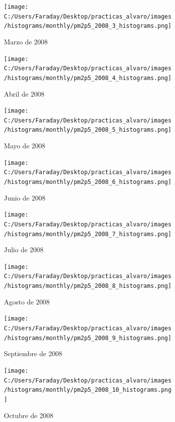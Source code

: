 \documentclass[12pt]{article}
\begin{document}
\begin{figure}[H]
\centering
\begin{subfigure}[h]{0.45\textwidth}
\texttt{[image: C:/Users/Faraday/Desktop/practicas\_alvaro/images/histograms/monthly/pm2p5\_2008\_3\_histograms.png]}
\caption{Marzo de 2008}
\label{fig:hist-mon-4-3-2008}
\end{subfigure}
%
\begin{subfigure}[H]{0.45\textwidth}
\texttt{[image: C:/Users/Faraday/Desktop/practicas\_alvaro/images/histograms/monthly/pm2p5\_2008\_4\_histograms.png]}
\caption{Abril de 2008}
\label{fig:hist-mon-4-4-2008}
\end{subfigure}
\caption{}
\end{figure}

\begin{figure}[H]
\centering
\begin{subfigure}[h]{0.45\textwidth}
\texttt{[image: C:/Users/Faraday/Desktop/practicas\_alvaro/images/histograms/monthly/pm2p5\_2008\_5\_histograms.png]}
\caption{Mayo de 2008}
\label{fig:hist-mon-4-5-2008}
\end{subfigure}
%
\begin{subfigure}[H]{0.45\textwidth}
\texttt{[image: C:/Users/Faraday/Desktop/practicas\_alvaro/images/histograms/monthly/pm2p5\_2008\_6\_histograms.png]}
\caption{Junio de 2008}
\label{fig:hist-mon-4-6-2008}
\end{subfigure}
\caption{}
\end{figure}

\newpage

\begin{figure}[H]
\centering
\begin{subfigure}[h]{0.45\textwidth}
\texttt{[image: C:/Users/Faraday/Desktop/practicas\_alvaro/images/histograms/monthly/pm2p5\_2008\_7\_histograms.png]}
\caption{Julio de 2008}
\label{fig:hist-mon-4-7-2008}
\end{subfigure}
%
\begin{subfigure}[H]{0.45\textwidth}
\texttt{[image: C:/Users/Faraday/Desktop/practicas\_alvaro/images/histograms/monthly/pm2p5\_2008\_8\_histograms.png]}
\caption{Agosto de 2008}
\label{fig:hist-mon-4-8-2008}
\end{subfigure}
\caption{}
\end{figure}

\begin{figure}[H]
\centering
\begin{subfigure}[h]{0.45\textwidth}
\texttt{[image: C:/Users/Faraday/Desktop/practicas\_alvaro/images/histograms/monthly/pm2p5\_2008\_9\_histograms.png]}
\caption{Septiembre de 2008}
\label{fig:hist-mon-4-9-2008}
\end{subfigure}
%
\begin{subfigure}[H]{0.45\textwidth}
\texttt{[image: C:/Users/Faraday/Desktop/practicas\_alvaro/images/histograms/monthly/pm2p5\_2008\_10\_histograms.png]}
\caption{Octubre de 2008}
\label{fig:hist-mon-4-10-2008}
\end{subfigure}
\caption{}
\end{figure}
\end{document}
